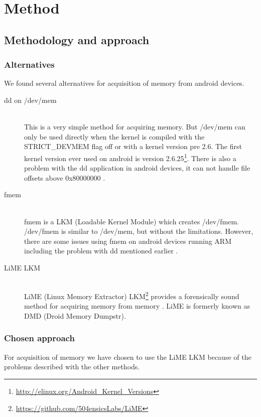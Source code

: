 \section{Method}
\subsection{Methodology and approach}
\subsubsection{Alternatives}\label{lime}
  We found several alternatives for acquisition of memory from android devices.
  \begin{description}
    \item[dd on /dev/mem] \hfill \\
      This is a very simple method for acquiring memory. But /dev/mem can only be used directly when the kernel is 
      compiled with the STRICT\_DEVMEM flag off or with a kernel version pre 2.6. The first kernel version ever used on 
      android is version 2.6.25\footnote{\url{http://elinux.org/Android\_Kernel\_Versions}}. There is also a problem with 
      the dd application in android devices, it can not handle file offsets above 0x80000000 \cite{acq_vol_android_mem}.
    \item[fmem] \hfill \\
      fmem is a LKM (Loadable Kernel Module) which creates /dev/fmem. /dev/fmem is similar to /dev/mem, but without the limitations. 
      However, there are some issues using fmem on android devices running ARM including the problem with dd mentioned earlier \cite{acq_vol_android_mem}.
    \item[LiME LKM] \hfill \\
      LiME (Linux Memory Extractor) LKM\footnote{\url{https://github.com/504ensicsLabs/LiME}} provides a forensically sound method for acquiring memory from 
      memory \cite{heriyanto2013procedures}. LiME is formerly known as DMD (Droid Memory Dumpstr).
  \end{description}
  \subsubsection{Chosen approach}
  For acquisition of memory we have chosen to use the LiME LKM because of the problems described with the other methods.
